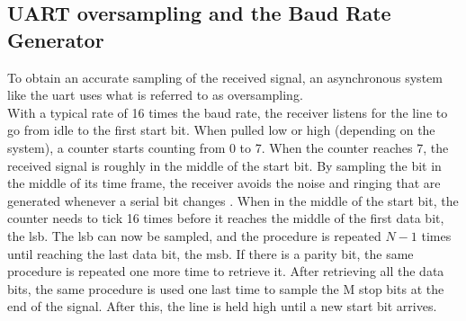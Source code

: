 \documentclass[main.tex]{subfiles}
\begin{document}
\subsection{UART oversampling and the Baud Rate Generator}

To obtain an accurate sampling of the received signal, an asynchronous system like the \gls{uart} uses what is referred to as oversampling. \\

With a typical rate of 16 times the baud rate, the receiver listens for the line to go from idle to the first start bit. When pulled low or high (depending on the system), a counter starts counting from 0 to 7. When the counter reaches 7, the received signal is roughly in the middle of the start bit. By sampling the bit in the middle of its time frame, the receiver avoids the noise and ringing that are generated whenever a serial bit changes \cite{rapid08}. When in the middle of the start bit, the counter needs to tick 16 times before it reaches the middle of the first data bit, the \gls{lsb}. The \gls{lsb} can now be sampled, and the procedure is repeated $N - 1$ times until reaching the last data bit, the \acrshort{msb}. If there is a parity bit, the same procedure is repeated one more time to retrieve it. After retrieving all the data bits, the same procedure is used one last time to sample the M stop bits at the end of the signal. After this, the line is held high until a new start bit arrives. 

\end{document}
